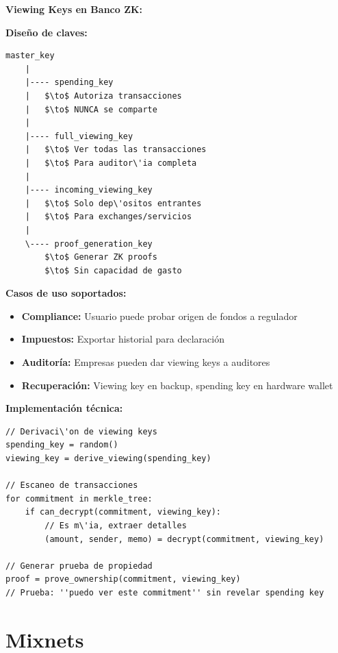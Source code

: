 \documentclass[11pt,a4paper,twoside]{book}
\begin{document}
\begin{bancozk}
\textbf{Viewing Keys en Banco ZK:}

\textbf{Dise\~no de claves:}

\begin{verbatim}
master_key
    |
    |---- spending_key
    |   $\to$ Autoriza transacciones
    |   $\to$ NUNCA se comparte
    |
    |---- full_viewing_key
    |   $\to$ Ver todas las transacciones
    |   $\to$ Para auditor\'ia completa
    |
    |---- incoming_viewing_key  
    |   $\to$ Solo dep\'ositos entrantes
    |   $\to$ Para exchanges/servicios
    |
    \---- proof_generation_key
        $\to$ Generar ZK proofs
        $\to$ Sin capacidad de gasto
\end{verbatim}

\textbf{Casos de uso soportados:}

\begin{itemize}
    \item \textbf{Compliance:} Usuario puede probar origen de fondos a regulador
    \item \textbf{Impuestos:} Exportar historial para declaraci\'on
    \item \textbf{Auditor\'ia:} Empresas pueden dar viewing keys a auditores
    \item \textbf{Recuperaci\'on:} Viewing key en backup, spending key en hardware wallet
\end{itemize}

\textbf{Implementaci\'on t\'ecnica:}
\begin{verbatim}
// Derivaci\'on de viewing keys
spending_key = random()
viewing_key = derive_viewing(spending_key)

// Escaneo de transacciones
for commitment in merkle_tree:
    if can_decrypt(commitment, viewing_key):
        // Es m\'ia, extraer detalles
        (amount, sender, memo) = decrypt(commitment, viewing_key)

// Generar prueba de propiedad
proof = prove_ownership(commitment, viewing_key)
// Prueba: ''puedo ver este commitment'' sin revelar spending key
\end{verbatim}
\end{bancozk}

\section{Mixnets}
\label{sec:mixnets}
\end{document}
